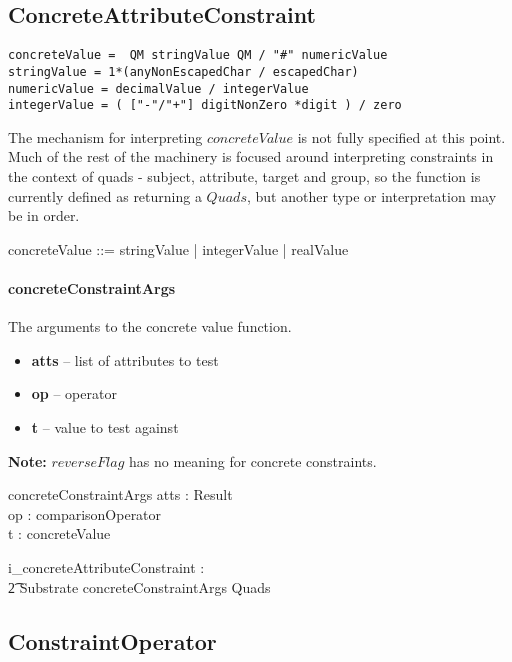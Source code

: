 \documentclass{article}
\begin{document}
\subsection{ConcreteAttributeConstraint}
\begin{verbatim}
concreteValue =  QM stringValue QM / "#" numericValue 
stringValue = 1*(anyNonEscapedChar / escapedChar)
numericValue = decimalValue / integerValue
integerValue = ( ["-"/"+"] digitNonZero *digit ) / zero
\end{verbatim}
The mechanism for interpreting $concreteValue$ is not fully specified at this point. 
Much of the rest of the machinery is focused around interpreting constraints in the context
of quads - subject, attribute, target and group, so the function is currently defined as returning
a $Quads$, but another type or interpretation may be in order.
\begin{zed}
concreteValue ::= stringValue | integerValue | realValue 
\end{zed}

\paragraph{concreteConstraintArgs}  The arguments to the concrete value function.
\begin{itemize}[noitemsep,nolistsep]
\item \textbf{atts} -- list of attributes to test
\item \textbf{op} -- operator
\item \textbf{t} -- value to test against
\end{itemize}
\noindent 
\textbf{Note:} $reverseFlag$ has no meaning for concrete constraints.

\begin{schema}{concreteConstraintArgs}
   atts : Result \\
   op : comparisonOperator \\
   t : concreteValue
\end{schema}

\begin{gendef}
  i\_concreteAttributeConstraint : \\
\t2 Substrate \fun concreteConstraintArgs \fun Quads
\end{gendef}


\subsection{ConstraintOperator}
\end{document}
